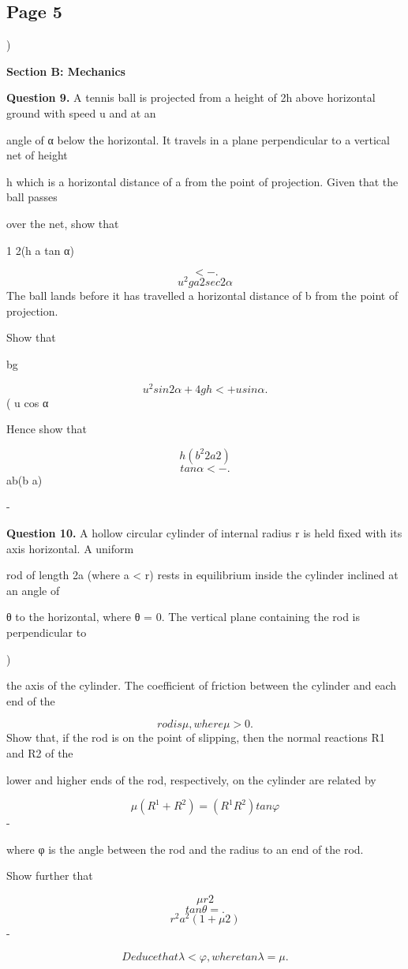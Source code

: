 \documentclass[12pt]{article}
\begin{document}
\subsection*{Page 5}
\begin{flushleft}
)\par
\bigskip\textbf{Section B: Mechanics}\par
\bigskip\textbf{Question 9.} A tennis ball is projected from a height of 2h above horizontal ground with speed u and at an\par
angle of α below the horizontal. It travels in a plane perpendicular to a vertical net of height\par
h which is a horizontal distance of a from the point of projection. Given that the ball passes\par
over the net, show that\par
1 2(h a tan α)\par
\[< - .\]
\[u^2 ga2 sec2 α\]
The ball lands before it has travelled a horizontal distance of b from the point of projection.\par
Show that\par
bg\par
\[u^2 sin 2 α + 4gh < + u sin α .\]
( u cos α\par
Hence show that\par
\[h(b^2 2a2)\]
\[tan α < - .\]
ab(b a)\par
-\par
\bigskip\textbf{Question 10.} A hollow circular cylinder of internal radius r is held fixed with its axis horizontal. A uniform\par
rod of length 2a (where a < r) rests in equilibrium inside the cylinder inclined at an angle of\par
θ to the horizontal, where θ = 0. The vertical plane containing the rod is perpendicular to\par
)\par
the axis of the cylinder. The coefficient of friction between the cylinder and each end of the\par
\[rod is μ, where μ > 0.\]
Show that, if the rod is on the point of slipping, then the normal reactions R1 and R2 of the\par
lower and higher ends of the rod, respectively, on the cylinder are related by\par
\[μ(R^1 + R^2) = (R^1 R^2) tan φ\]
-\par
where φ is the angle between the rod and the radius to an end of the rod.\par
Show further that\par
\[μr2\]
\[tan θ = .\]
\[r^2 a^2(1 + μ2)\]
-\par
\[Deduce that λ < φ, where tan λ = μ.\]
\end{flushleft}
\end{document}
